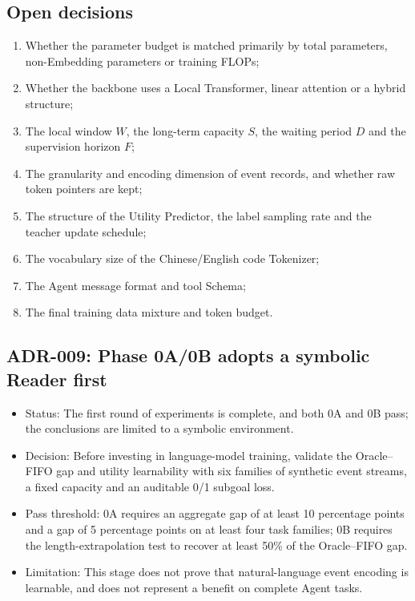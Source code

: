 \subsection{Open decisions}

\begin{enumerate}
  \item Whether the parameter budget is matched primarily by total parameters, non-Embedding parameters or training FLOPs;
  \item Whether the backbone uses a Local Transformer, linear attention or a hybrid structure;
  \item The local window $W$, the long-term capacity $S$, the waiting period $D$ and the supervision horizon $F$;
  \item The granularity and encoding dimension of event records, and whether raw token pointers are kept;
  \item The structure of the Utility Predictor, the label sampling rate and the teacher update schedule;
  \item The vocabulary size of the Chinese/English code Tokenizer;
  \item The Agent message format and tool Schema;
  \item The final training data mixture and token budget.
\end{enumerate}

\subsection*{ADR-009: Phase 0A/0B adopts a symbolic Reader first}

\begin{itemize}
  \item Status: The first round of experiments is complete, and both 0A and 0B pass; the conclusions are limited to a symbolic environment.
  \item Decision: Before investing in language-model training, validate the Oracle--FIFO gap and utility learnability with six families of synthetic event streams, a fixed capacity and an auditable 0/1 subgoal loss.
  \item Pass threshold: 0A requires an aggregate gap of at least 10 percentage points and a gap of 5 percentage points on at least four task families; 0B requires the length-extrapolation test to recover at least 50\% of the Oracle--FIFO gap.
  \item Limitation: This stage does not prove that natural-language event encoding is learnable, and does not represent a benefit on complete Agent tasks.
\end{itemize}
